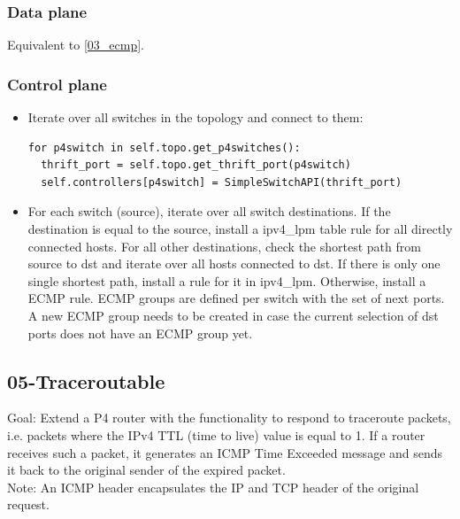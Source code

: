 \documentclass[11pt,oneside,a4paper]{article}
\begin{document}
\subsubsection{Data plane}

Equivalent to \ref{03_ecmp}.

\subsubsection{Control plane}

\vspace{-\topsep}
\begin{itemize}
	\setlength{\itemsep}{0pt}
	\setlength{\parskip}{0pt}
	\item Iterate over all switches in the topology and connect to them:
	\vspace{-\topsep}
	\begin{lstlisting}
for p4switch in self.topo.get_p4switches():
  thrift_port = self.topo.get_thrift_port(p4switch)
  self.controllers[p4switch] = SimpleSwitchAPI(thrift_port)
	\end{lstlisting}
	\item For each switch (source), iterate over all switch destinations. If the destination is equal to the source, install a ipv4\_lpm table rule for all directly connected hosts. For all other destinations, check the shortest path from source to dst and iterate over all hosts connected to dst. If there is only one single shortest path, install a rule for it in ipv4\_lpm. Otherwise, install a ECMP rule. ECMP groups are defined per switch with the set of next ports. A new ECMP group needs to be created in case the current selection of dst ports does not have an ECMP group yet.
\end{itemize}
\vspace{-\topsep}

\subsection{05-Traceroutable}

Goal: Extend a P4 router with the functionality to respond to traceroute packets, i.e. packets where the IPv4 TTL (time to live) value is equal to 1. If a router receives such a packet, it generates an ICMP Time Exceeded message and sends it back to the original sender of the expired packet.\\
Note: An ICMP header encapsulates the IP and TCP header of the original request.
\end{document}

